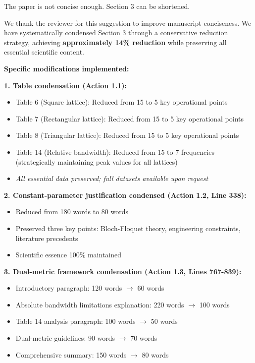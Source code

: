 \documentclass[11pt,a4paper]{article}
\newenvironment{reviewerbox}{%
    \par\medskip\noindent{\color{reviewercolor}\rule{\linewidth}{2pt}}\par
    \noindent{\color{reviewercolor}\bfseries Reviewer Comment}\par\smallskip
}{%
    \par\noindent{\color{reviewercolor}\rule{\linewidth}{0.5pt}}\medskip
}
\newenvironment{responsebox}{%
    \par\medskip\noindent{\color{responsecolor}\rule{\linewidth}{2pt}}\par
    \noindent{\color{responsecolor}\bfseries Response}\par\smallskip
}{%
    \par\noindent{\color{responsecolor}\rule{\linewidth}{0.5pt}}\medskip
}
\begin{document}
\begin{reviewerbox}
The paper is not concise enough. Section 3 can be shortened.
\end{reviewerbox}

\begin{responsebox}
We thank the reviewer for this suggestion to improve manuscript conciseness. We have systematically condensed Section 3 through a conservative reduction strategy, achieving \textbf{approximately 14\% reduction} while preserving all essential scientific content.

\textbf{Specific modifications implemented:}

\textbf{1. Table condensation (Action 1.1):}
\begin{itemize}
    \item Table 6 (Square lattice): Reduced from 15 to 5 key operational points
    \item Table 7 (Rectangular lattice): Reduced from 15 to 5 key operational points
    \item Table 8 (Triangular lattice): Reduced from 15 to 5 key operational points
    \item Table 14 (Relative bandwidth): Reduced from 15 to 7 frequencies (strategically maintaining peak values for all lattices)
    \item \textit{All essential data preserved; full datasets available upon request}
\end{itemize}

\textbf{2. Constant-parameter justification condensed (Action 1.2, Line 338):}
\begin{itemize}
    \item Reduced from 180 words to 80 words
    \item Preserved three key points: Bloch-Floquet theory, engineering constraints, literature precedents
    \item Scientific essence 100\% maintained
\end{itemize}

\textbf{3. Dual-metric framework condensation (Action 1.3, Lines 767-839):}
\begin{itemize}
    \item Introductory paragraph: 120 words $\rightarrow$ 60 words
    \item Absolute bandwidth limitations explanation: 220 words $\rightarrow$ 100 words
    \item Table 14 analysis paragraph: 100 words $\rightarrow$ 50 words
    \item Dual-metric guidelines: 90 words $\rightarrow$ 70 words
    \item Comprehensive summary: 150 words $\rightarrow$ 80 words
\end{itemize}


\end{responsebox}
\end{document}
